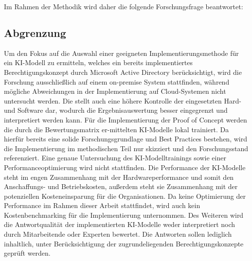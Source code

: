 
Im Rahmen der Methodik wird daher die folgende Forschungsfrage beantwortet:
\begin{center}
\end{center}


\subsection{Abgrenzung}
Um den Fokus auf die Auswahl einer geeigneten Implementierungsmethode für ein KI-Modell zu ermitteln, welches ein bereits implementiertes Berechtigungskonzept durch Microsoft Active Directory berücksichtigt, wird die Forschung ausschließlich auf einem on-premise System stattfinden, während mögliche Abweichungen in der Implementierung auf Cloud-Systemen nicht untersucht werden. Die stellt auch eine höhere Kontrolle der eingesetzten Hard- und Software dar, wodurch die Ergebnisauswertung besser eingegrenzt und interpretiert werden kann.
Für die Implementierung der Proof of Concept werden die durch die Bewertungsmatrix er-mittelten KI-Modelle lokal trainiert. Da hierfür bereits eine solide Forschungsgrundlage und Best Practices bestehen, wird die Implementierung im methodischen Teil nur skizziert und den Forschungsstand referenziert. Eine genaue Untersuchung des KI-Modelltrainings sowie einer Performanceoptimierung wird nicht stattfinden. 
Die Performance der KI-Modelle steht im engen Zusammenhang mit der Hardwareperformance und somit den Anschaffungs- und Betriebskosten, außerdem steht sie Zusammenhang mit der potenziellen Kosteneinsparung für die Organisationen. Da keine Optimierung der Performance im Rahmen dieser Arbeit stattfindet, wird auch kein Kostenbenchmarking für die Implementierung unternommen. 
Des Weiteren wird die Antwortqualität der implementierten KI-Modelle weder interpretiert noch durch Mitarbeitende oder Experten bewertet. Die Antworten sollen lediglich inhaltlich, unter Berücksichtigung der zugrundeliegenden Berechtigungskonzepte geprüft werden. 
